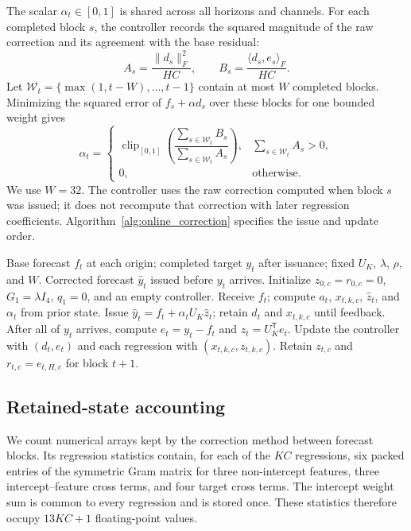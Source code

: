 The scalar $\alpha_t\in[0,1]$ is shared across all horizons and channels. For each completed block $s$, the controller records the squared magnitude of the raw correction and its agreement with the base residual:
\begin{equation}
 A_s=\frac{\lVert d_s\rVert_F^2}{HC},\qquad
 B_s=\frac{\langle d_s,e_s\rangle_F}{HC}.
 \label{eq:blend_statistics}
\end{equation}
Let $\mathcal W_t=\{\max(1,t-W),\ldots,t-1\}$ contain at most $W$ completed blocks. Minimizing the squared error of $f_s+\alpha d_s$ over these blocks for one bounded weight gives
\begin{equation}
 \alpha_t=\begin{cases}
 \operatorname{clip}_{[0,1]}\!\left(
 \dfrac{\sum_{s\in\mathcal W_t}B_s}
 {\sum_{s\in\mathcal W_t}A_s}\right),
 &\sum_{s\in\mathcal W_t}A_s>0,\\
 0,&\text{otherwise}.
 \end{cases}
 \label{eq:blend_weight}
\end{equation}
We use $W=32$. The controller uses the raw correction computed when block $s$ was issued; it does not recompute that correction with later regression coefficients. Algorithm~\ref{alg:online_correction} specifies the issue and update order.

\begin{algorithm}[H]
\caption{Online retained-state correction}
\label{alg:online_correction}
\renewcommand{\algorithmicrequire}{\textbf{Input:}}
\renewcommand{\algorithmicensure}{\textbf{Output:}}
\begin{algorithmic}[1]
\REQUIRE Base forecast $f_t$ at each origin; completed target $y_t$ after issuance; fixed $U_K$, $\lambda$, $\rho$, and $W$.
\ENSURE Corrected forecast $\widehat y_t$ issued before $y_t$ arrives.
\STATE Initialize $z_{0,c}=r_{0,c}=0$, $G_1=\lambda I_4$, $q_1=0$, and an empty controller.
\STATE Receive $f_t$; compute $a_t$, $x_{t,k,c}$, $\widehat z_t$, and $\alpha_t$ from prior state.
\STATE Issue $\widehat y_t=f_t+\alpha_t U_K\widehat z_t$; retain $d_t$ and $x_{t,k,c}$ until feedback.
\STATE After all of $y_t$ arrives, compute $e_t=y_t-f_t$ and $z_t=U_K^{\mathsf T}e_t$.
\STATE Update the controller with $(d_t,e_t)$ and each regression with $(x_{t,k,c},z_{t,k,c})$.
\STATE Retain $z_{t,c}$ and $r_{t,c}=e_{t,H,c}$ for block $t+1$.
\ENDFOR
\end{algorithmic}
\end{algorithm}

\subsection{Retained-state accounting}
We count numerical arrays kept by the correction method between forecast blocks. Its regression statistics contain, for each of the $KC$ regressions, six packed entries of the symmetric Gram matrix for three non-intercept features, three intercept--feature cross terms, and four target cross terms. The intercept weight sum is common to every regression and is stored once. These statistics therefore occupy $13KC+1$ floating-point values.

